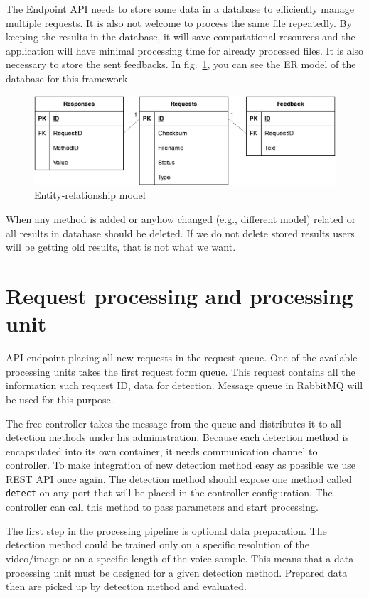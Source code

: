 The Endpoint API needs to store some data in a database to efficiently manage multiple requests. It is also not welcome to process the same file repeatedly. By keeping the results in the database, it will save computational resources and the application will have minimal processing time for already processed files. It is also necessary to store the sent feedbacks. In fig.~\ref{fig:framework_architecture_database}, you can see the ER model of the database for this framework.

\begin{figure}[H]
    \centering
    \includegraphics[width=.725\linewidth]{other-fig/framework_architecture_database.png}
    \caption{Entity-relationship model}
    \label{fig:framework_architecture_database}
\end{figure}

When any method is added or anyhow changed (e.g., different model) related or all results in database should be deleted. If we do not delete stored results users will be getting old results, that is not what we want.

\section{Request processing and processing unit}

API endpoint placing all new requests in the request queue. One of the available processing units takes the first request form queue. This request contains all the information such request ID, data for detection. Message queue in RabbitMQ will be used for this purpose.

The free controller takes the message from the queue and distributes it to all detection methods under his administration. Because each detection method is encapsulated into its own container, it needs communication channel to controller. To make integration of new detection method easy as possible we use REST API once again. The detection method should expose one method called \texttt{detect} on any port that will be placed in the controller configuration. The controller can call this method to pass parameters and start processing.

The first step in the processing pipeline is optional data preparation. The detection method could be trained only on a specific resolution of the video/image or on a specific length of the voice sample. This means that a data processing unit must be designed for a given detection method. Prepared data then are picked up by detection method and evaluated.

